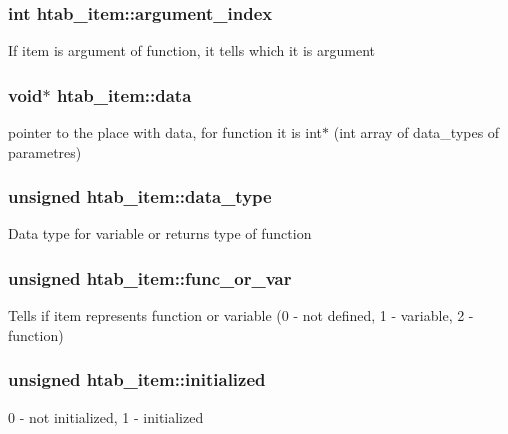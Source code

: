 \subsubsection[{argument\+\_\+index}]{\setlength{\rightskip}{0pt plus 5cm}int htab\+\_\+item\+::argument\+\_\+index}\label{structhtab__item_a890983537face39050d82ef9087c12ff}
If item is argument of function, it tells which it is argument \hypertarget{structhtab__item_aa1b7ec267e7ba427e04f1c2f36fd12b6}{}
\subsubsection[{data}]{\setlength{\rightskip}{0pt plus 5cm}void$\ast$ htab\+\_\+item\+::data}\label{structhtab__item_aa1b7ec267e7ba427e04f1c2f36fd12b6}
pointer to the place with data, for function it is int$\ast$ (int array of data\+\_\+types of parametres) \hypertarget{structhtab__item_a884c03e9b59149a95829a71901276a8b}{}
\subsubsection[{data\+\_\+type}]{\setlength{\rightskip}{0pt plus 5cm}unsigned htab\+\_\+item\+::data\+\_\+type}\label{structhtab__item_a884c03e9b59149a95829a71901276a8b}
Data type for variable or returns type of function \hypertarget{structhtab__item_a646c1a75cab8e90247c082d080782803}{}
\subsubsection[{func\+\_\+or\+\_\+var}]{\setlength{\rightskip}{0pt plus 5cm}unsigned htab\+\_\+item\+::func\+\_\+or\+\_\+var}\label{structhtab__item_a646c1a75cab8e90247c082d080782803}
Tells if item represents function or variable (0 -\/ not defined, 1 -\/ variable, 2 -\/ function) \hypertarget{structhtab__item_a7a297ff53beac4e5bd00982369fee710}{}
\subsubsection[{initialized}]{\setlength{\rightskip}{0pt plus 5cm}unsigned htab\+\_\+item\+::initialized}\label{structhtab__item_a7a297ff53beac4e5bd00982369fee710}
0 -\/ not initialized, 1 -\/ initialized \hypertarget{structhtab__item_a88ce186940697b2875ed88bdaca2db12}{}
